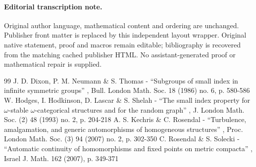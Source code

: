 \documentclass[11pt]{article}
\begin{document}
\paragraph{Editorial transcription note.}
Original author language, mathematical content and ordering are unchanged. Publisher front matter is replaced by this independent layout wrapper. Original native statement, proof and macros remain editable; bibliography is recovered from the matching cached publisher HTML. No assistant-generated proof or mathematical repair is supplied.
\clearpage
\setcounter{section}{5}


\setcounter{thm}{1}
\setcounter{thm}{3}
\begin{thebibliography}{99}
 J. D. Dixon, P. M. Neumann \& S. Thomas - “Subgroups of small index in infinite symmetric groups” , Bull. London Math. Soc. 18 (1986) no. 6, p. 580-586
 W. Hodges, I. Hodkinson, D. Lascar \& S. Shelah - “The small index property for $\omega $-stable $\omega $-categorical structures and for the random graph” , J. London Math. Soc. (2) 48 (1993) no. 2, p. 204-218
 A. S. Kechris \& C. Rosendal - “Turbulence, amalgamation, and generic automorphisms of homogeneous structures” , Proc. London Math. Soc. (3) 94 (2007) no. 2, p. 302-350
 C. Rosendal \& S. Solecki - “Automatic continuity of homomorphisms and fixed points on metric compacta” , Israel J. Math. 162 (2007), p. 349-371
\end{thebibliography}
\end{document}
